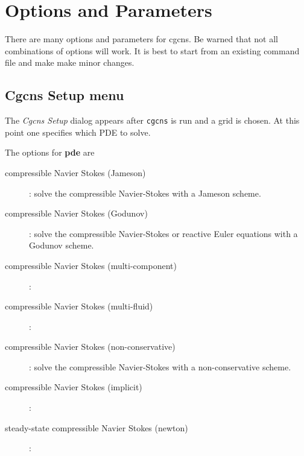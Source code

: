 \documentclass{article}
\newcommand{\solver}{cgcns}
\begin{document}
\clearpage
\section{Options and Parameters} \label{sec:parameters}

There are many options and parameters for \solver. Be warned that not all
combinations of options will work.  It is best to start from an existing command
file and make make minor changes.


\subsection{Cgcns Setup menu}\label{sec:setupDialog}

The {\em  Cgcns Setup} dialog appears after {\tt cgcns} is run and a grid is chosen.
At this point one specifies which PDE to solve.


\noindent The options for {\bf pde} are
\begin{description}
  \item[\qquad compressible Navier Stokes (Jameson)] : solve the compressible Navier-Stokes with a Jameson scheme.
  \item[\qquad compressible Navier Stokes (Godunov)] : solve the compressible Navier-Stokes or reactive Euler equations with a Godunov scheme.
  \item[\qquad compressible Navier Stokes (multi-component)] : 
  \item[\qquad compressible Navier Stokes (multi-fluid)] : 
  \item[\qquad compressible Navier Stokes (non-conservative)] : solve the compressible Navier-Stokes with a non-conservative scheme.
  \item[\qquad compressible Navier Stokes (implicit)] : 
  \item[\qquad steady-state compressible Navier Stokes (newton) ] :
\end{description}
\end{document}
